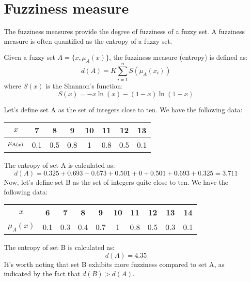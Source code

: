 \section{Fuzziness measure}

The fuzziness measures provide the degree of fuzziness of a fuzzy set. A fuzziness measure is often quantified as the entropy of a fuzzy set.
\newpage
\begin{definition}
    Given a fuzzy set $A=\{x,\mu_A(x)\}$, the fuzziness measure (entropy) is defined as:
    \[d(A)=K \sum_{i=1}^{n}S(\mu_A(x_i))\]
    where $S(x)$ is the Shannon's function: 
    \[S(x)=-x \ln(x)-(1-x)\ln(1-x)\]
\end{definition}
\begin{example}
    Let's define set A as the set of integers close to ten. We have the following data:
    \begin{center}
        \begin{tabular}{|c|c|c|c|c|c|c|c|} 
        \hline
            $x$ & 7 & 8 & 9 & 10 & 11 & 12 & 13 \\ \hline
            $\mu_{\textnormal{A}(x)}$ & 0.1 & 0.5 & 0.8 & 1 & 0.8 & 0.5 & 0.1 \\ \hline
        \end{tabular}
    \end{center}
    The entropy of set A is calculated as:
    \[d(A)=0.325+0.693+0.673+0.501+0+0.501+0.693+0.325=3.711\]
    Now, let's define set B as the set of integers quite close to ten. We have the following data:
    \begin{center}
        \begin{tabular}{|c|c|c|c|c|c|c|c|c|c|} 
            \hline
            $x$         & 6     & 7     & 8     & 9     & 10    & 11    & 12    & 13    & 14 \\ \hline
            $\mu_A(x)$  & 0.1   & 0.3   & 0.4   & 0.7   & 1     & 0.8   & 0.5   & 0.3   & 0.1 \\ \hline
        \end{tabular}
    \end{center}
    The entropy of set B is calculated as:
    \[d(A)=4.35\]
    It's worth noting that set B exhibits more fuzziness compared to set A, as indicated by the fact that $d(B)>d(A)$.
\end{example}